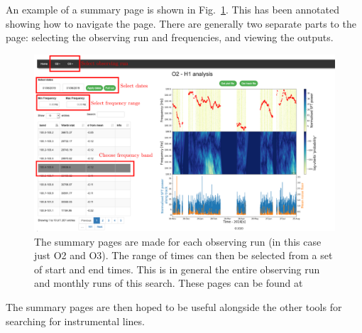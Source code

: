 An example of a summary page is shown in Fig.~\ref{detchar:summary:plots}. This has been annotated showing how to navigate the page. 
There are generally two separate parts to the page: selecting the observing run and frequencies, and viewing the outputs.


\begin{figure}
	\centering
	\includegraphics[width=\textwidth]{C5_detchar/summary_annot.pdf}
	\caption{The summary pages are made for each observing run (in this case just O2 and O3). The range of times can then be selected from a set of start and end times. This is in general the entire observing run and monthly runs of this search. These pages can be found at \citep{bayleyHome}}
	\label{detchar:summary:plots}
\end{figure}

The summary pages are then hoped to be useful alongside the other tools for searching for instrumental lines. 

